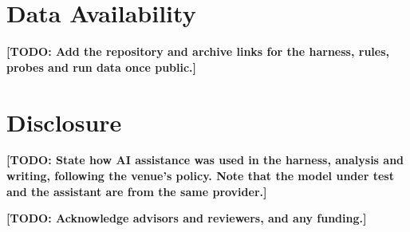 \documentclass[manuscript,screen,nonacm]{acmart}
\newcommand{\todo}[1]{\textbf{[TODO: #1]}}
\begin{document}
\section*{Data Availability}
\todo{Add the repository and archive links for the harness, rules, probes and run data once public.}

\section*{Disclosure}
\todo{State how AI assistance was used in the harness, analysis and writing, following the venue's policy. Note that the model under test and the assistant are from the same provider.}

\begin{acks}
\todo{Acknowledge advisors and reviewers, and any funding.}
\end{acks}



\end{document}
